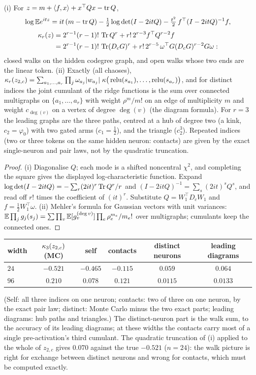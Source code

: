 \begin{theorem}\label{thm:walks}
(i) For $z=m+\langle f,x\rangle+x^{\top}Qx-\operatorname{tr} Q$,
\[
\log\mathbb E e^{itz}=it\,(m-\operatorname{tr} Q)-\tfrac12\log\det(I-2itQ)-\tfrac{t^2}2\,f^{\top}(I-2itQ)^{-1}f ,
\]
\begin{align*}
\kappa_r(z)&=2^{r-1}(r-1)!\,\operatorname{Tr} Q^r+r!\,2^{r-3}f^{\top}Q^{r-2}f\\
&=2^{r-1}(r-1)!\,\operatorname{Tr}(D_cG)^r+r!\,2^{r-5}\,\omega^{\top}G(D_cG)^{r-2}G\omega :
\end{align*}
closed walks on the hidden codegree graph, and open walks whose two ends are the linear token.
(ii) Exactly (all chaoses), $\kappa_r(z_{2,c})=\sum_{a_1,\dots,a_r}\prod_j\omega_{a_j}|w_{a_j}|\;\kappa\big(\operatorname{relu}(s_{a_1}),\dots,\operatorname{relu}(s_{a_r})\big)$, and for
distinct indices the joint cumulant of the ridge functions is the sum over connected multigraphs on $\{a_1,\dots,a_r\}$
with weight $\rho^m/m!$ on an edge of multiplicity $m$ and weight $c_{\deg(v)}$ on a vertex of degree $\deg(v)$ (the diagram
formula). For $r=3$ the leading graphs are the three paths, centred at a hub of degree two (a kink, $c_2=\varphi_0$) with
two gated arms ($c_1=\tfrac12$), and the triangle ($c_2^3$). Repeated indices (two or three tokens on the same hidden
neuron: contacts) are given by the exact single-neuron and pair laws, not by the quadratic truncation.
\end{theorem}
\begin{proof}
(i) Diagonalise $Q$; each mode is a shifted noncentral $\chi^2$, and completing the square gives the displayed
log-characteristic function. Expand $\log\det(I-2itQ)=-\sum_r(2it)^r\operatorname{Tr} Q^r/r$ and $(I-2itQ)^{-1}=\sum_s(2it)^sQ^s$, and read off $r!$
times the coefficient of $(it)^r$. Substitute $Q=W_1^{\top}D_cW_1$ and $f=\tfrac12W_1^{\top}\omega$. (ii) Mehler's formula for
Gaussian vectors with unit variances: $\mathbb E\prod_jg_j(s_j)=\sum\prod_{v}\mathbb E[g_v^{(\deg v)}]\prod_{e}\rho_e^{m_e}/m_e!$ over multigraphs;
cumulants keep the connected ones.
\end{proof}
\begin{center}\small
\begin{tabular}{lccccc}\toprule
width & $\kappa_3(z_{2,c})$ (MC) & self & contacts & distinct neurons & leading diagrams\\\midrule
$24$ & $-0.521$ & $-0.465$ & $-0.115$ & $0.059$ & $0.064$\\
$96$ & $0.210$ & $0.078$ & $0.121$ & $0.0115$ & $0.0133$\\\bottomrule
\end{tabular}
\end{center}
(Self: all three indices on one neuron; contacts: two of three on one neuron, by the exact pair law; distinct: Monte
Carlo minus the two exact parts; leading diagrams: hub paths and triangles.) The distinct-neuron part is the walk sum, to the accuracy of its leading diagrams; at these widths the contacts carry
most of a single pre-activation's third cumulant. The quadratic truncation of (i) applied to the whole of $z_{2,c}$ gives
$0.070$ against the true $-0.521$ ($n=24$): the walk picture is right for exchange between distinct neurons and wrong for
contacts, which must be computed exactly.


